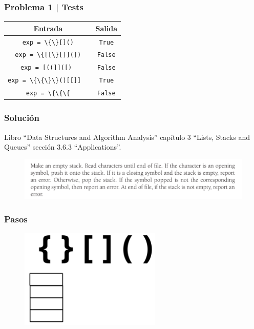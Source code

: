 \documentclass[17pt, t, lualatex]{beamer}
\newcommand{\cppinline}[1]{\lstinline[style=cppstyle]!#1!}
\begin{document}
\begin{frame}
  \frametitle{Problema 1 | Tests}

  \begin{table}[h]
  \centering
  \Large  %
  \begin{tabular}[h]{|c|c|}
    \hline
    \textbf{Entrada} & \textbf{Salida} \\ \hline
    \cppinline{exp = \{\}[]()} & \cppinline{True} \\ \hline
    \cppinline{exp = \{[[\}[]](])} & \cppinline{False} \\ \hline
    \cppinline{exp = [((]]([) } & \cppinline{False} \\ \hline
    \cppinline{exp = \{\{\}\}()[[]]  } & \cppinline{True} \\ \hline
    \cppinline{exp = \{\{\{} & \cppinline{False} \\ \hline
  \end{tabular}
\end{table}


\end{frame}

\begin{frame}
  \frametitle{Solución}

  Libro ``Data Structures and Algorithm Analysis''\cite{weiss2020data} capítulo 3 ``Lists, Stacks and Queues'' sección 3.6.3 ``Applications''.

  \begin{figure}[h]
    \centering
    \includegraphics[width=1\textwidth]{img/Problema1Solucion.png}
  \end{figure}

\end{frame}


\begin{frame}
  \frametitle{Pasos}
  \begin{figure}[h]
    \centering
    \includegraphics[width=0.6\textwidth]{img/Problema1-1.png}
  \end{figure}
\end{frame}
\end{document}
